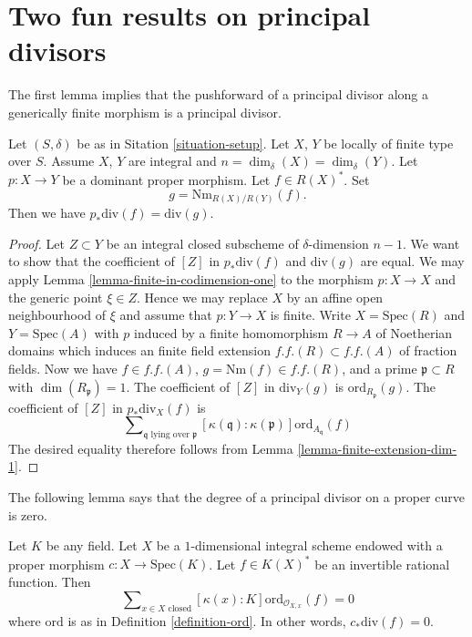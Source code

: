 \section{Two fun results on principal divisors}
\label{section-two-fun}

\noindent
The first lemma implies that the pushforward of a principal
divisor along a generically finite morphism is a principal divisor.

\begin{lemma}
\label{lemma-proper-pushforward-alteration}
Let $(S, \delta)$ be as in Sitation \ref{situation-setup}.
Let $X$, $Y$ be locally of finite type over $S$. Assume $X$, $Y$
are integral and $n = \dim_\delta(X) = \dim_\delta(Y)$.
Let $p : X \to Y$ be a dominant proper morphism.
Let $f \in R(X)^*$. Set
$$
g = \text{Nm}_{R(X)/R(Y)}(f).
$$
Then we have
$p_*\text{div}(f) = \text{div}(g)$.
\end{lemma}

\begin{proof}
Let $Z \subset Y$ be an integral closed subscheme of $\delta$-dimension
$n - 1$. We want to show that the coefficient of $[Z]$ in
$p_*\text{div}(f)$ and $\text{div}(g)$ are equal. We may apply
Lemma \ref{lemma-finite-in-codimension-one}
to the morphism $p : X \to X$ and the generic point $\xi \in Z$.
Hence we may replace $X$ by an
affine open neighbourhood of $\xi$ and assume that $p : Y \to X$ is finite.
Write $X = \text{Spec}(R)$ and $Y = \text{Spec}(A)$ with $p$ induced
by a finite homomorphism $R \to A$ of Noetherian domains which induces
an finite field extension $f.f.(R) \subset f.f.(A)$ of fraction fields.
Now we have $f \in f.f.(A)$, $g = \text{Nm}(f) \in f.f.(R)$,
and a prime $\mathfrak p \subset R$ with $\dim(R_{\mathfrak p}) = 1$.
The coefficient of $[Z]$ in $\text{div}_Y(g)$ is
$\text{ord}_{R_\mathfrak p}(g)$.
The coefficient of $[Z]$ in $p_*\text{div}_X(f)$ is
$$
\sum\nolimits_{\mathfrak q\text{ lying over }\mathfrak p}
[\kappa(\mathfrak q) : \kappa(\mathfrak p)]
\text{ord}_{A_{\mathfrak q}}(f)
$$
The desired equality therefore follows from
Lemma \ref{lemma-finite-extension-dim-1}.
\end{proof}

\noindent
The following lemma says that the degree of a principal divisor on
a proper curve is zero.

\begin{lemma}
\label{lemma-curve-principal-divisor}
Let $K$ be any field. Let $X$ be a $1$-dimensional integral scheme
endowed with a proper morphism $c : X \to \text{Spec}(K)$.
Let $f \in K(X)^*$ be an invertible rational function.
Then
$$
\sum\nolimits_{x \in X \text{ closed}}
[\kappa(x) : K] \text{ord}_{\mathcal{O}_{X, x}}(f)
=
0
$$
where $\text{ord}$ is as in Definition \ref{definition-ord}.
In other words, $c_*\text{div}(f) = 0$.
\end{lemma}


